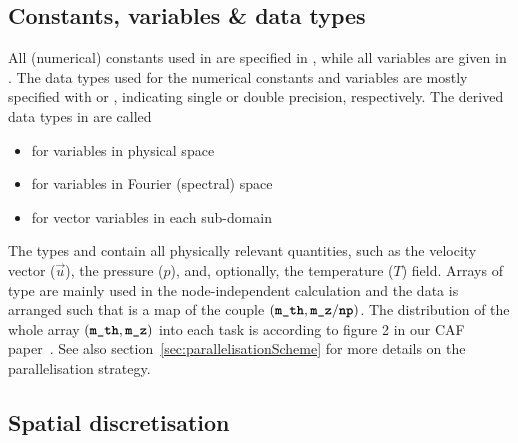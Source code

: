 \documentclass[a4paper, 11pt, DIV=11]{scrartcl}
\begin{document}
\subsection{Constants, variables \& data types}
\label{sec:constantVariablesAndDataTypes}

All (numerical) constants used in \nsc are specified in , while
all variables are given in . The data types used for the numerical
constants and variables are mostly specified with  or ,
indicating single or double precision, respectively. The derived data types in
 are called
\begin{itemize}
\item {} for variables in physical space
\item {} for variables in Fourier (spectral) space
\item {} for vector variables in each \mpi sub-domain
\end{itemize}
The types  and  contain all physically relevant quantities, such as
the velocity vector ($\vec{u}$), the pressure ($p$), and, optionally, the temperature ($T$)
field. Arrays of type  are mainly used in the node-independent calculation
and the data is arranged such that  is a map of the couple
$(\textbf{\texttt{\color{black}m\_th}}, \textbf{\texttt{\color{black}m\_z}}/\textbf{\texttt{\color{black}np}})$. The distribution of the whole array
$(\textbf{\texttt{\color{black}m\_th}}, \textbf{\texttt{\color{black}m\_z}})$ into each \mpi task is according to figure 2 in our CAF
paper~\cite{Shi2015}. See also section~\ref{sec:parallelisationScheme} for more details on
the parallelisation strategy.

\subsection{Spatial discretisation}
\label{sec:spatialDiscretisation}
\end{document}
